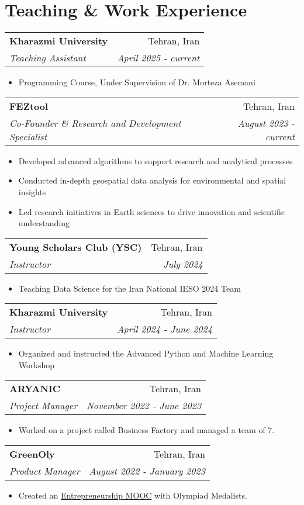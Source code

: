 \documentclass[letterpaper,11pt]{article}
\makeatletter
\newcommand{\resitem}[1]{\item #1 \vspace{-2pt}}
\newcommand{\ressubheading}[4]{
	\begin{tabular*}{6.5in}{l@{\cftdotfill{\cftsecdotsep}\extracolsep{\fill}}r}
		\textbf{#1} & #2 \\
		\textit{#3} & \textit{#4} \\
	\end{tabular*}\vspace{-8pt}
}
\makeatother
\begin{document}
	\section{Teaching \& Work Experience}
	\ressubheading{Kharazmi University}{Tehran, Iran}{Teaching Assistant}{April 2025 - current}
	\begin{itemize}[topsep=7.5pt,partopsep=0pt,itemsep=3.5pt,parsep=0pt]
		\resitem{Programming Course, Under Supervision of Dr. Morteza Asemani}
	\end{itemize}
	\ressubheading{FEZtool}{Tehran, Iran}{Co-Founder \& Research and Development Specialist}{August 2023 - current}
\begin{itemize}[topsep=7.5pt,partopsep=0pt,itemsep=3.5pt,parsep=0pt]
	\resitem{Developed advanced algorithms to support research and analytical processes}
	\resitem{Conducted in-depth geospatial data analysis for environmental and spatial insights}
	\resitem{Led research initiatives in Earth sciences to drive innovation and scientific understanding}
\end{itemize}
	\ressubheading{Young Scholars Club (YSC)}{Tehran, Iran}{Instructor}{July 2024}
\begin{itemize}[topsep=7.5pt,partopsep=0pt,itemsep=3.5pt,parsep=0pt]
	\resitem{Teaching Data Science for the Iran National IESO 2024 Team}
\end{itemize}
	\ressubheading{Kharazmi University}{Tehran, Iran}{Instructor}{April 2024 - June 2024}
\begin{itemize}[topsep=7.5pt,partopsep=0pt,itemsep=3.5pt,parsep=0pt]
	\resitem{Organized and instructed the Advanced Python and Machine Learning Workshop}
\end{itemize}
	\ressubheading{ARYANIC}{Tehran, Iran}{Project Manager}{November 2022 - June 2023}
\begin{itemize}[topsep=7.5pt,partopsep=0pt,itemsep=3.5pt,parsep=0pt]
	\resitem{Worked on a project called Business Factory and managed a team of 7.}
\end{itemize}

	\ressubheading{GreenOly}{Tehran, Iran}{Product Manager}{August 2022 - January 2023}
\begin{itemize}[topsep=7.5pt,partopsep=0pt,itemsep=3.5pt,parsep=0pt]
	\resitem{Created an \href{https://aradfarahani.com/MOOC/}{Entrepreneurship MOOC} with Olympiad Medalists.}
\end{itemize}

\end{document}
